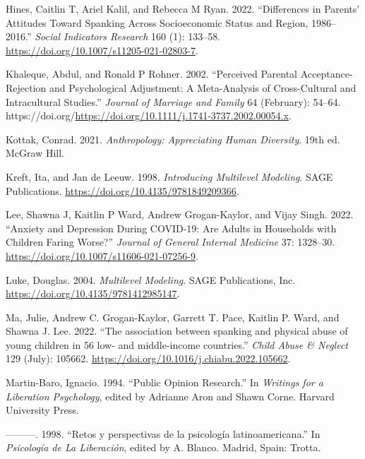 \documentclass[
  letterpaper,
  DIV=11,
  numbers=noendperiod]{scrreprt}
\newlength{\cslhangindent}
\newlength{\cslentryspacingunit} %
\newenvironment{CSLReferences}[2] %
 {%
  \setlength{\parindent}{0pt}
  \ifodd #1
  \let\oldpar\par
  \def\par{\hangindent=\cslhangindent\oldpar}
  \fi
  \setlength{\parskip}{#2\cslentryspacingunit}
 }%
 {}
\begin{document}
\begin{CSLReferences}{1}{0}
\leavevmode{}%
Hines, Caitlin T, Ariel Kalil, and Rebecca M Ryan. 2022. {``{Differences
in Parents' Attitudes Toward Spanking Across Socioeconomic Status and
Region, 1986--2016}.''} \emph{Social Indicators Research} 160 (1):
133--58. \url{https://doi.org/10.1007/s11205-021-02803-7}.

\leavevmode{}%
Khaleque, Abdul, and Ronald P Rohner. 2002. {``Perceived Parental
Acceptance-Rejection and Psychological Adjustment: A Meta-Analysis of
Cross-Cultural and Intracultural Studies.''} \emph{Journal of Marriage
and Family} 64 (February): 54--64.
https://doi.org/\url{https://doi.org/10.1111/j.1741-3737.2002.00054.x}.

\leavevmode{}%
Kottak, Conrad. 2021. \emph{Anthropology: Appreciating Human Diversity}.
19th ed. McGraw Hill.

\leavevmode{}%
Kreft, Ita, and Jan de Leeuw. 1998. \emph{Introducing Multilevel
Modeling}. SAGE Publications.
\url{https://doi.org/10.4135/9781849209366}.

\leavevmode{}%
Lee, Shawna J, Kaitlin P Ward, Andrew Grogan-Kaylor, and Vijay Singh.
2022. {``Anxiety and Depression During {COVID-19}: Are Adults in
Households with Children Faring Worse?''} \emph{Journal of General
Internal Medicine} 37: 1328--30.
\url{https://doi.org/10.1007/s11606-021-07256-9}.

\leavevmode{}%
Luke, Douglas. 2004. \emph{Multilevel Modeling}. SAGE Publications, Inc.
\url{https://doi.org/10.4135/9781412985147}.

\leavevmode{}%
Ma, Julie, Andrew C. Grogan-Kaylor, Garrett T. Pace, Kaitlin P. Ward,
and Shawna J. Lee. 2022. {``{The association between spanking and
physical abuse of young children in 56 low- and middle-income
countries}.''} \emph{Child Abuse \& Neglect} 129 (July): 105662.
\url{https://doi.org/10.1016/j.chiabu.2022.105662}.

\leavevmode{}%
Martin-Baro, Ignacio. 1994. {``Public Opinion Research.''} In
\emph{Writings for a Liberation Psychology}, edited by Adrianne Aron and
Shawn Corne. Harvard University Press.

\leavevmode{}%
---------. 1998. {``{Retos y perspectivas de la psicología
latinoamericana}.''} In \emph{Psicología de La Liberación}, edited by A.
Blanco. Madrid, Spain: Trotta.


\end{CSLReferences}
\end{document}
